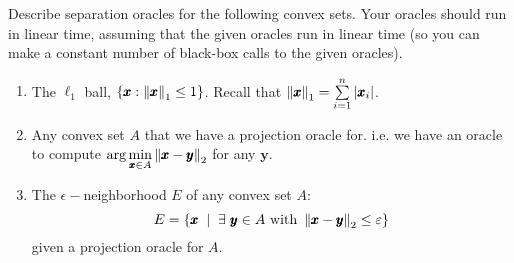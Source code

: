 \newpage
\pb
Describe separation oracles for the following convex sets. Your oracles should run in linear time, assuming that the given oracles run in linear time (so you can make a constant number of black-box calls to the given oracles).
\begin{enumerate}[label=(\alph*)]
\item The $\ell_{1}$ ball, $\left\{\pmb x : \left\lVert \pmb x \right\rVert_{1} \le 1\right\}$. Recall that $\left\lVert \pmb x \right\rVert_{1} = \sum\limits_{i=1}^{n}\left| \pmb x_{i} \right|$.
\item Any convex set $A$ that we have a projection oracle for. i.e. we have an oracle to compute $\displaystyle\arg \min_{\pmb x\in A} \left\lVert \pmb x-\pmb y \right\rVert_{2}$ for any $\pmb y$.
\item The $\epsilon-$neighborhood $E$ of any convex set $A$: $$E=\set{\pmb x\st \exists ~ \pmb y\in A \text{ with } \norm{\pmb x-\pmb y}{2}\le\epsilon}$$ given a projection oracle for $A$.
\end{enumerate}

\soln

